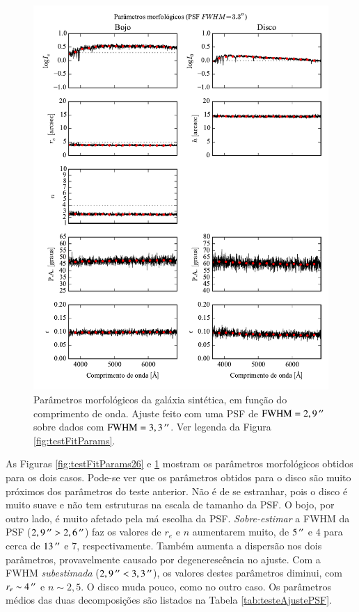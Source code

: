 \begin{figure}
	\includegraphics{figuras/simulation_fitparams_psf33}
	\caption[Parâmetros morfológicos (teste com PSF $\mathrm{FWHM} =
	3,3\,\arcs$).] {Parâmetros morfológicos da galáxia sintética, em função do comprimento de
	onda. Ajuste feito com uma PSF de $\mathrm{FWHM} = 2,9\,^{\prime\prime}$ sobre
	dados com $\mathrm{FWHM} = 3,3\,\arcs$. Ver legenda da Figura
	\ref{fig:testFitParams}.}
	\label{fig:testFitParams33}
\end{figure}

As Figuras \ref{fig:testFitParams26} e \ref{fig:testFitParams33} mostram os
parâmetros morfológicos obtidos para os dois casos. Pode-se ver que os
parâmetros obtidos para o disco são muito próximos dos parâmetros do teste
anterior. Não é de se estranhar, pois o disco é muito suave e não tem estruturas
na escala de tamanho da PSF. O bojo, por outro lado, é muito afetado pela má
escolha da PSF. {\em Sobre-estimar} a FWHM da PSF ($2,9\,^{\prime\prime} > 2,6\,^{\prime\prime}$)
faz os valores de $r_e$ e $n$ aumentarem muito, de $5\,^{\prime\prime}$ e $4$ para cerca
de $13\,^{\prime\prime}$ e $7$, respectivamente. Também aumenta a dispersão nos dois
parâmetros, provavelmente causado por degenerescência no ajuste. Com a FWHM {\em
subestimada} ($2,9\,^{\prime\prime} < 3,3\,^{\prime\prime}$), os valores destes parâmetros diminui,
com $r_e \sim 4\,^{\prime\prime}$ e $n \sim 2,5$. O disco muda pouco, como no outro caso.
Os parâmetros médios das duas decomposições são listados na Tabela
\ref{tab:testeAjustePSF}.

